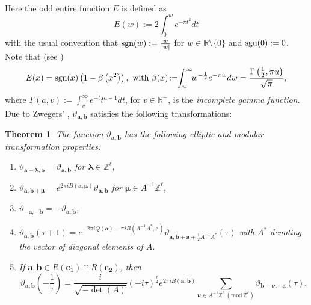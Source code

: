 \documentclass[12pt,reqno]{amsart}
\renewcommand{\b}{\beta}
\newcommand{\G}{\Gamma}
\renewcommand{\l}{\lambda}
\renewcommand{\t}{\tau}
\renewcommand{\(}{\left\(}
\renewcommand{\)}{\right\)}
\numberwithin{equation}{section}
\theoremstyle{plain}
\newtheorem{theorem}{Theorem}[section]
\theoremstyle{definition}
\numberwithin{equation}{section}
\renewcommand{\pmod}[1]{\ \left( \mathrm{mod} \, #1 \right)}
\begin{document}
Here the odd entire function $E$ is defined as 
\[
E(w):=2\int_{0}^{w}e^{-\pi t^2}dt
\]
with the usual convention that $\textnormal{sgn}(w):=\frac{w}{|w|}$ for $w\in \mathbb{R}\setminus\{0\}$ and $\textnormal{sgn}(0):=0$. Note that (see \cite[Lemma 1.7]{Zw}) 
\begin{equation}\label{Ebeta}
E(x)=\textnormal{sgn}(x)\left(1-\b\left(x^2\right)\right),\ \text{with}\ \b(x)\!:=\!\!\int_{u}^{\infty}\!\!w^{-\frac 12}e^{-\pi w}dw=\frac{\G\left(\frac 12,\pi u\right)}{\sqrt{\pi}},
\end{equation}
where $\G(a,v):=\int_{v}^{\infty}e^{-t}t^{a-1}dt$, for $v\in \mathbb{R}^{+}$, is the {\it incomplete gamma function}.\\
Due to Zwegers' \cite[Corollary 2.9]{Zw}, $\vartheta_{\bm{a},\bm{b}}$ satisfies the following transformations:
\begin{theorem}\label{Zwmainthm1}
	The function $\vartheta_{\bm{a},\bm{b}}$ has the following elliptic and modular transformation properties:
	\begin{enumerate}
		\item $\vartheta_{\bm{a}+\bm{\l},\bm{b}}=\vartheta_{\bm{a},\bm{b}}$ for $\bm{\l}\in \mathbb{Z}^{\ell}$,
		\item $\vartheta_{\bm{a},\bm{b}+{\bm \mu}}=e^{2\pi iB(\bm{a},\bm{\mu})}\vartheta_{\bm{a},\bm{b}}$ for $\bm{\mu}\in A^{-1}\mathbb{Z}^{\ell}$,
		\item $\vartheta_{-\bm{a},-\bm{b}}=-\vartheta_{\bm{a},\bm{b}}$,
		\item $\vartheta_{\bm{a},\bm{b}}(\t+1)=e^{-2\pi i Q(\bm{a})-\pi i B(A^{-1}A^*,\bm{a})}\vartheta_{\bm{a},\bm{b}+\bm{a}+\frac 12A^{-1}A^{*}}(\t)$ with $A^*$ denoting the vector of diagonal elements of $A$.
		\item If $\bm{a}, \bm{b}\in R(\bm{c_1})\cap R(\bm{c_2})$, then
		\[
		\vartheta_{\bm{a},\bm{b}}\left(-\frac 1\t\right)=\frac{i}{\sqrt{-\det (A)}}\left(-i\t\right)^{\frac{\ell}{2}}e^{2\pi i B(\bm{a},\bm{b})}\sum_{\bm{\nu}\in A^{-1}\mathbb{Z}^{\ell}\pmod{\mathbb{Z}^{\ell}}}\vartheta_{\bm{b}+\bm{\nu},-\bm{a}}(\t).
		\]
	\end{enumerate}
\end{theorem}
\end{document}
